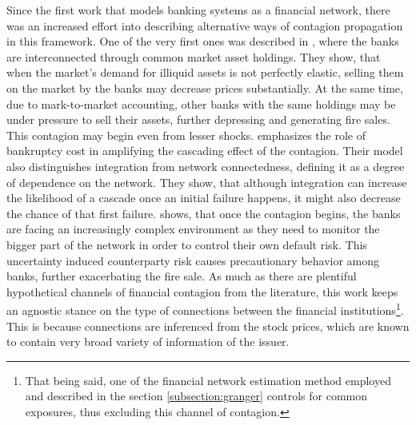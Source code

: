 \documentclass[12pt]{article}
\begin{document}
Since the first work that models banking systems as a financial network, there was an increased effort into describing alternative ways of contagion propagation in this framework. One of the very first ones was described in \cite{cifuentes05}, where the banks are interconnected through common market asset holdings. They show, that when the market's demand for illiquid assets is not perfectly elastic, selling them on the market by the banks may decrease prices substantially. At the same time, due to mark-to-market accounting, other banks with the same holdings may be under pressure to sell their assets, further depressing and generating fire sales. This contagion may begin even from lesser shocks. \citet{elliot14} emphasizes the role of bankruptcy cost in amplifying the cascading effect of the contagion. Their model also distinguishes integration from network connectedness, defining it as a degree of dependence on the network. They show, that although integration can increase the likelihood of a cascade once an initial failure happens, it might also decrease the chance of that first failure. \cite{caballero13} shows, that once the contagion begins, the banks are facing an increasingly complex environment as they need to monitor the bigger part of the network in order to control their own default risk. This uncertainty induced counterparty risk causes precautionary behavior among banks, further exacerbating the fire sale. As much as there are plentiful hypothetical channels of financial contagion from the literature, this work keeps an agnostic stance on the type of connections between the financial institutions\footnote{That being said, one of the financial network estimation method employed and described in the section \ref{subsection:granger} controls for common exposures, thus excluding this channel of contagion.}. This is because connections are inferenced from the stock prices, which are known to contain very broad variety of information of the issuer.
\end{document}
